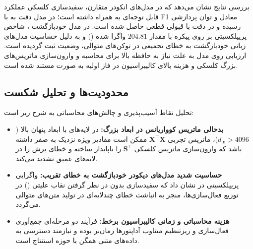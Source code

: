 بررسی نتایج نشان می‌دهد که در مدل‌های انکودر متقارن، سفیدسازی کلسکی عملکرد قابل توجه‌ای به همراه داشته است؛ در مدل  دقت به  با F1 معادل  و توان پردازشی  رسیده و در  دقت  با قبولی قطعی  حاصل شده است. در مدل خودبازگشت ، شاخص پریپلکسیتی بر روی پیکره  با مقدار $204.81$ واگرا شده () و به دلیل حساسیت مدل‌های زبانی خودبازگشت به خطای تجمیعی در توکن‌های متوالی، وضعیت  ثبت گردیده است. ارزیابی روی مدل  به علت نیاز به حافظه بالا برای محاسبه و وارون‌سازی ماتریس‌های بزرگ کلسکی و هزینه بالای کالیبراسیون در فاز اولیه به صورت  مستند شده است.

\subsection{محدودیت‌ها و تحلیل شکست}
تحلیل نقاط آسیب‌پذیری و چالش‌های محاسباتی  به شرح زیر است:
\begin{itemize}
    \item \textbf{بدحالی ماتریس کوواریانس در ابعاد بزرگ:} در لایه‌های با ابعاد پنهان بالا ($d_{\text{in}} > 4096$)، ماتریس تجربی $\mathbf{X}^\top \mathbf{X}$ ممکن است مقادیر ویژه نزدیک به صفر داشته باشد که وارون‌سازی ماتریس کلسکی $\mathbf{S}^\top$ را ناپایدار ساخته و خطای برش را در لایه‌های عمیق تشدید می‌کند.
    \item \textbf{حساسیت شدید مدل‌های دیکودر خودبازگشت به خطای تقریب:} واگرایی پریپلکسیتی در  نشان داد که سفیدسازی بدون در نظر گرفتن نقاب علیتی () در توزیع فعال‌سازی‌ها، منجر به انباشت خطای چندلایه‌ای در تولید متن‌های متوالی می‌گردد.
    \item \textbf{هزینه محاسباتی و زمانی کالیبراسیون برخط:} فرآیند دو مرحله‌ای جمع‌آوری فعال‌سازی و ریزتنظیم متناوب آداپتورها زمان‌بر بوده و نیازمند دسترسی به داده‌های متنی همگن با حوزه استنتاج است.
\end{itemize}
